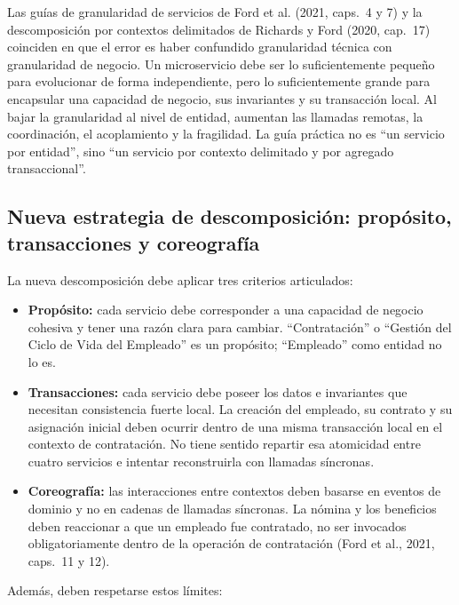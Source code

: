 \documentclass[12pt,a4paper]{article}
\begin{document}
Las guías de granularidad de servicios de Ford et al. (2021, caps.~4 y 7) y la descomposición por contextos delimitados de Richards y Ford (2020, cap.~17) coinciden en que el error es haber confundido granularidad técnica con granularidad de negocio. Un microservicio debe ser lo suficientemente pequeño para evolucionar de forma independiente, pero lo suficientemente grande para encapsular una capacidad de negocio, sus invariantes y su transacción local. Al bajar la granularidad al nivel de entidad, aumentan las llamadas remotas, la coordinación, el acoplamiento y la fragilidad. La guía práctica no es ``un servicio por entidad'', sino ``un servicio por contexto delimitado y por agregado transaccional''.

\subsection{Nueva estrategia de descomposición: propósito, transacciones y coreografía}

La nueva descomposición debe aplicar tres criterios articulados:

\begin{itemize}[label=$\cdot$]
  \item \textbf{Propósito:} cada servicio debe corresponder a una capacidad de negocio cohesiva y tener una razón clara para cambiar. ``Contratación'' o ``Gestión del Ciclo de Vida del Empleado'' es un propósito; ``Empleado'' como entidad no lo es.
  \item \textbf{Transacciones:} cada servicio debe poseer los datos e invariantes que necesitan consistencia fuerte local. La creación del empleado, su contrato y su asignación inicial deben ocurrir dentro de una misma transacción local en el contexto de contratación. No tiene sentido repartir esa atomicidad entre cuatro servicios e intentar reconstruirla con llamadas síncronas.
  \item \textbf{Coreografía:} las interacciones entre contextos deben basarse en eventos de dominio y no en cadenas de llamadas síncronas. La nómina y los beneficios deben reaccionar a que un empleado fue contratado, no ser invocados obligatoriamente dentro de la operación de contratación (Ford et al., 2021, caps.~11 y 12).
\end{itemize}

Además, deben respetarse estos límites:
\end{document}
